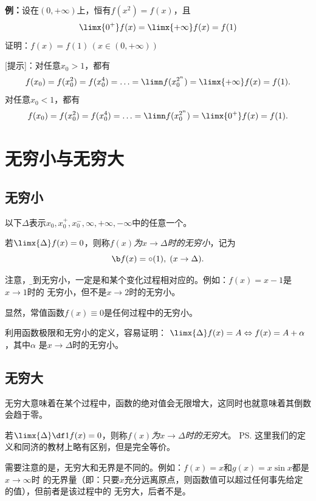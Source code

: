 {\bf 例：}设在$(0,+\infty)$上，恒有$f(x^2)=f(x)$，且
$$\limx{0^+}f(x)=\limx{+\infty}f(x)=f(1)$$
证明：$f(x)=f(1)\,(x\in(0,+\infty))$

[提示]：对任意$x_0>1$，都有
$$f(x_0)=f(x_0^2)=f(x_0^4)=\ldots=\limn f(x_0^{2^n})=\limx{+\infty}f(x)=f(1).$$
对任意$x_0<1$，都有
$$f(x_0)=f(x_0^2)=f(x_0^4)=\ldots=\limn f(x_0^{2^n})=\limx{0^+}f(x)=f(1).$$

\section{无穷小与无穷大}

\subsection{无穷小}

以下$\Delta$表示$x_0,x_0^+,x_0^-,\infty,+\infty,-\infty$中的任意一个。

若$\limx{\Delta}f(x)=0$，则称{\it $f(x)$为$x\to\Delta$时的无穷小}，记为
$${\b f(x)=\circ(1),\;(x\to\Delta).}$$

注意，{\b 谈到无穷小，一定是和某个变化过程相对应的}。例如：$f(x)=x-1$是$x\to 1$时的
无穷小，但不是$x\to 2$时的无穷小。

显然，常值函数$f(x)\equiv 0$是任何过程中的无穷小。

利用函数极限和无穷小的定义，容易证明：
$\limx{\Delta}f(x)=A\Leftrightarrow f(x)=A+\alpha$，其中$\alpha$
  是$x\to\Delta$时的无穷小。

\subsection{无穷大}

无穷大意味着在某个过程中，函数的绝对值会无限增大，这同时也就意味着其倒数会趋于零。

若$\limx{\Delta}\df1{f(x)}=0$，则称{\it $f(x)$为$x\to\Delta$时的无穷大}。
\ps{这里我们的定义和同济的教材上略有区别，但是完全等价}。

需要注意的是，无穷大和无界是不同的。例如：$f(x)=x$和$g(x)=x\sin x$都是$x\to\infty$时
的无界量（即：只要$x$充分远离原点，则函数值可以超过任何事先给定的值），但前者是该过程中的
无穷大，后者不是。

